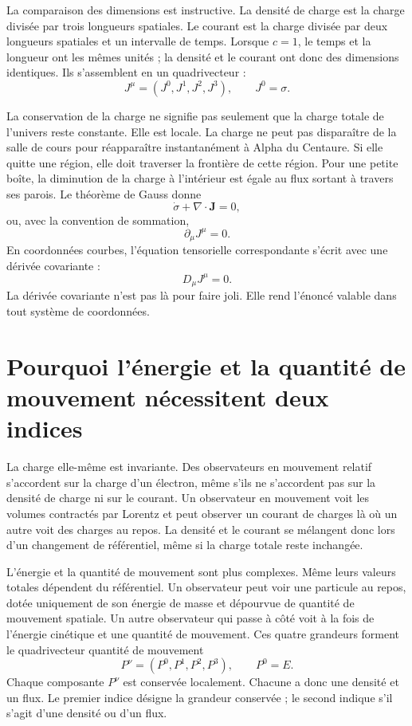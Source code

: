 La comparaison des dimensions est instructive. La densité de charge est la charge divisée par trois longueurs spatiales. Le courant est la charge divisée par deux longueurs spatiales et un intervalle de temps. Lorsque \(c=1\), le temps et la longueur ont les mêmes unités ; la densité et le courant ont donc des dimensions identiques. Ils s’assemblent en un quadrivecteur :
\begin{equation}
 J^\mu=(J^0,J^1,J^2,J^3),
 \qquad J^0=\sigma.
\end{equation}

La conservation de la charge ne signifie pas seulement que la charge totale de l’univers reste constante. Elle est locale. La charge ne peut pas disparaître de la salle de cours pour réapparaître instantanément à Alpha du Centaure. Si elle quitte une région, elle doit traverser la frontière de cette région. Pour une petite boîte, la diminution de la charge à l’intérieur est égale au flux sortant à travers ses parois. Le théorème de Gauss donne
\begin{equation}
 \dot{\sigma}+\nabla\cdot\mathbf{J}=0,
\end{equation}
ou, avec la convention de sommation,
\begin{equation}
 \partial_\mu J^\mu=0.
 \label{eq:charge-continuity}
\end{equation}
En coordonnées courbes, l’équation tensorielle correspondante s’écrit avec une dérivée covariante :
\begin{equation}
 D_\mu J^\mu=0.
\end{equation}
La dérivée covariante n’est pas là pour faire joli. Elle rend l’énoncé valable dans tout système de coordonnées.

\section{Pourquoi l’énergie et la quantité de mouvement nécessitent deux indices}

La charge elle-même est invariante. Des observateurs en mouvement relatif s’accordent sur la charge d’un électron, même s’ils ne s’accordent pas sur la densité de charge ni sur le courant. Un observateur en mouvement voit les volumes contractés par Lorentz et peut observer un courant de charges là où un autre voit des charges au repos. La densité et le courant se mélangent donc lors d’un changement de référentiel, même si la charge totale reste inchangée.

L’énergie et la quantité de mouvement sont plus complexes. Même leurs valeurs totales dépendent du référentiel. Un observateur peut voir une particule au repos, dotée uniquement de son énergie de masse et dépourvue de quantité de mouvement spatiale. Un autre observateur qui passe à côté voit à la fois de l’énergie cinétique et une quantité de mouvement. Ces quatre grandeurs forment le quadrivecteur quantité de mouvement
\begin{equation}
 P^\nu=(P^0,P^1,P^2,P^3),
 \qquad P^0=E.
\end{equation}
Chaque composante \(P^\nu\) est conservée localement. Chacune a donc une densité et un flux. Le premier indice désigne la grandeur conservée ; le second indique s’il s’agit d’une densité ou d’un flux.

